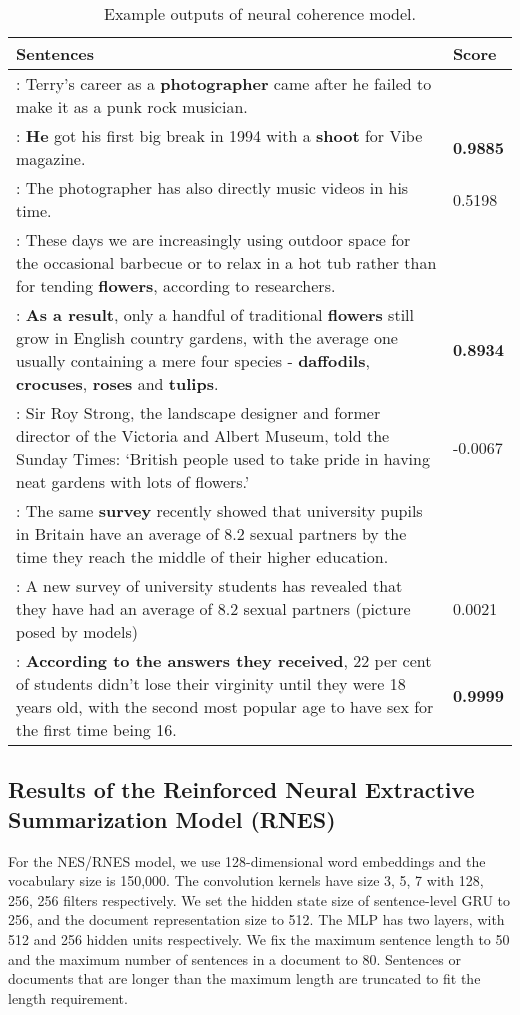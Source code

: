 \documentclass[letterpaper]{article} \usepackage{aaai18}  \usepackage{times}  \usepackage{helvet}  \usepackage{courier}  \usepackage{url}  \usepackage{graphicx}  \usepackage{amssymb}
\begin{document}
\begin{table}[htb]
		\centering
		\caption{Example outputs of neural coherence model.}
		\label{tab:coherence_examples}
		\begin{tabular}{|p{65mm}|p{10mm}|}
			\hline
			 \centering Sentences &  Score \\\hline
			: \small{Terry's career as a \textbf{photographer} came after he failed to make it as a punk rock musician.} & \\
			: \small{\textbf{He} got his first big break in 1994 with a \textbf{shoot} for Vibe magazine.} & \textbf{0.9885} \\
			: \small{The photographer has also directly music videos in his time.} & 0.5198 \\
			 \hline
			 : \small{These days we are increasingly using outdoor space for the occasional barbecue or to relax in a hot tub rather than for tending \textbf{flowers}, according to researchers.} & \\
			 : \small{\textbf{As a result}, only a handful of traditional \textbf{flowers} still grow in English country gardens, with the average one usually containing a mere four species - \textbf{daffodils}, \textbf{crocuses}, \textbf{roses} and \textbf{tulips}.} & \textbf{0.8934} \\
			 : \small{Sir Roy Strong, the landscape designer and former director of the Victoria and Albert Museum, told the Sunday Times: `British people used to take pride in having neat gardens with lots of flowers.'} & -0.0067 \\
			\hline
			: \small{The same \textbf{survey} recently showed that university pupils in Britain have an average of 8.2 sexual partners by the time they reach the middle of their higher education.} & \\
			: \small{A new survey of university students has revealed that they have had an average of 8.2 sexual partners (picture posed by models)} & 0.0021 \\
			: \small{\textbf{According to the answers they received}, 22 per cent of students didn't lose their virginity until they were 18 years old, with the second most popular age to have sex for the first time being 16. } & \textbf{0.9999} \\
\hline
		\end{tabular}
	\end{table}


	\subsection{Results of the Reinforced Neural Extractive Summarization Model (RNES)}
	For the NES/RNES model, we use 128-dimensional word embeddings and the vocabulary size is 150,000. The convolution kernels have size 3, 5, 7 with 128, 256, 256 filters respectively. We set the hidden state size of sentence-level GRU to 256, and the document representation size to 512. The MLP has two layers, with 512 and 256 hidden units respectively. We fix the maximum sentence length to 50 and the maximum number of sentences in a document to 80. Sentences or documents that are longer than the maximum length are truncated to fit the length requirement.
	
\end{document}
